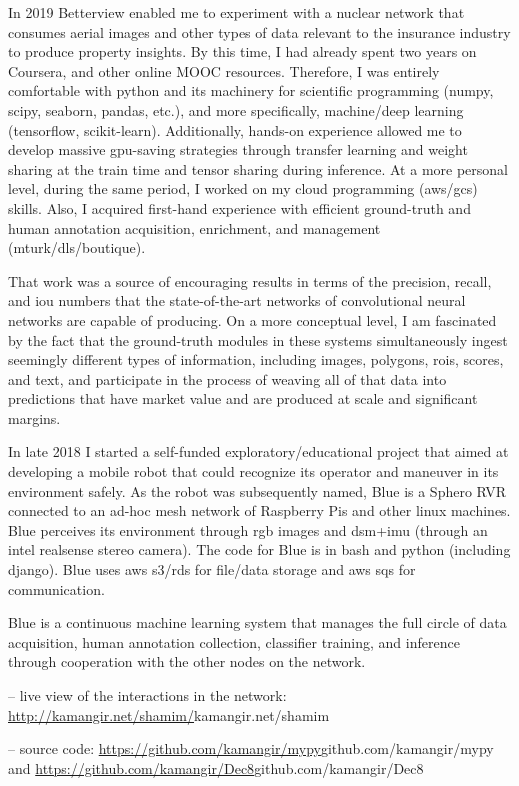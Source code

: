 \osspacing
In 2019 Betterview enabled me to experiment with a nuclear network that consumes aerial images and other types of data relevant to the insurance industry to produce property insights. By this time, I had already spent two years on Coursera, and other online MOOC resources. Therefore, I was entirely comfortable with python and its machinery for scientific programming (numpy, scipy, seaborn, pandas, etc.), and more specifically, machine/deep learning (tensorflow, scikit-learn). Additionally, hands-on experience allowed me to develop massive gpu-saving strategies through transfer learning and weight sharing at the train time and tensor sharing during inference. At a more personal level, during the same period, I worked on my cloud programming (aws/gcs) skills. Also, I acquired first-hand experience with efficient ground-truth and human annotation acquisition, enrichment, and management (mturk/dls/boutique).

\osspacing
That work was a source of encouraging results in terms of the precision, recall, and iou numbers that the state-of-the-art networks of convolutional neural networks are capable of producing. On a more conceptual level, I am fascinated by the fact that the ground-truth modules in these systems simultaneously ingest seemingly different types of information, including images, polygons, rois, scores, and text, and participate in the process of weaving all of that data into predictions that have market value and are produced at scale and significant margins.		


\osspacing
In late 2018 I started a self-funded exploratory/educational project that aimed at developing a mobile robot that could recognize its operator and maneuver in its environment safely. As the robot was subsequently named, Blue is a Sphero RVR connected to an ad-hoc mesh network of Raspberry Pis and other linux machines. Blue perceives its environment through rgb images and dsm+imu (through an intel realsense stereo camera). The code for Blue is in bash and python (including django). Blue uses aws s3/rds for file/data storage and aws sqs for communication.

\osspacing
Blue is a continuous machine learning system that manages the full circle of data acquisition, human annotation collection, classifier training, and inference through cooperation with the other nodes on the network. 

-- live view of the interactions in the network: \url{http://kamangir.net/shamim/}{kamangir.net/shamim} 

-- source code: \url{https://github.com/kamangir/mypy}{github.com/kamangir/mypy} and \url{https://github.com/kamangir/Dec8}{github.com/kamangir/Dec8}

